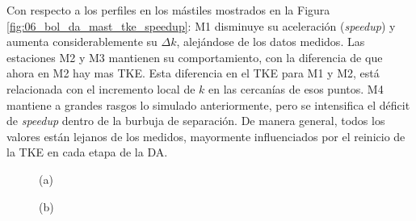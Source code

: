 \vspace*{\fill}
\newpage
Con respecto a los perfiles en los mástiles mostrados en la Figura \ref{fig:06_bol_da_mast_tke_speedup}: M1 disminuye su aceleración (\emph{speedup}) y aumenta considerablemente su $\Delta k$, alejándose de los datos medidos. Las estaciones M2 y M3 mantienen su comportamiento, con la diferencia de que ahora en M2 hay mas TKE. Esta diferencia en el TKE para M1 y M2, está relacionada con el incremento local de $k$ en las cercanías de esos puntos. M4 mantiene a grandes rasgos lo simulado anteriormente, pero se intensifica el déficit de \emph{speedup} dentro de la burbuja de separación. De manera general, todos los valores están lejanos de los medidos, mayormente influenciados por el reinicio de la TKE en cada etapa de la DA.
\vspace*{\fill}
\begin{figure}[H]
	\begin{minipage}{0.5\linewidth}
		\centering
		\hspace{7mm}(a)\end{minipage}%
	\begin{minipage}{0.5\linewidth}
		\centering
		\hspace{-5mm}(b)\end{minipage}%
	

\end{figure}

